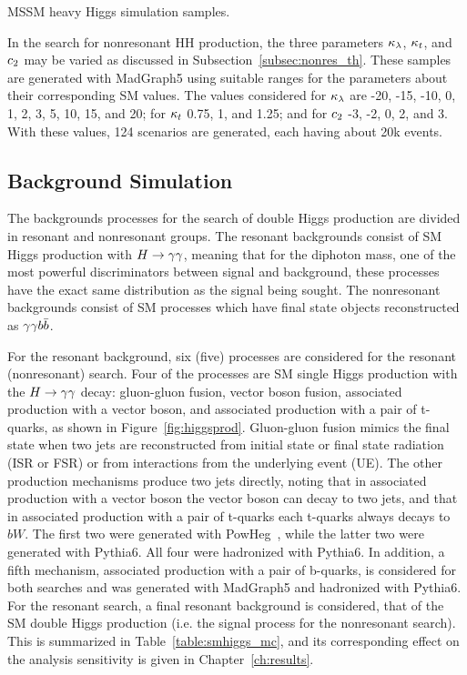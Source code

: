 \begin{table}[ht]
  \centering
  \renewcommand{\arraystretch}{1.4}
  \caption{MSSM heavy Higgs simulation samples.}
  
  \label{table:mssm_mc}
\end{table}

In the search for nonresonant HH production, the three parameters $\kappa_{\lambda}$, $\kappa_{t}$, and $c_2$
may be varied as discussed in Subsection~\ref{subsec:nonres_th}. These samples are generated
with MadGraph5 using suitable ranges for the parameters about their corresponding SM values. The
values considered for $\kappa_{\lambda}$ are -20, -15, -10, 0, 1, 2, 3, 5, 10, 15, and 20; for $\kappa_{t}$ 0.75, 1, and 1.25; and for $c_2$ -3, -2, 0, 2, and 3.
With these values, 124 scenarios are generated, each having about 20k events.

\subsection{Background Simulation\label{subsec:bkg_samples}}

The backgrounds processes for the search of double Higgs production are divided in resonant and
nonresonant groups. The resonant backgrounds consist of SM Higgs production with $H\to\gamma\gamma$, meaning
that for the diphoton mass, one of the most powerful discriminators between signal and background,
these processes have the exact same distribution as the signal being sought. The nonresonant backgrounds
consist of SM processes which have final state objects reconstructed as $\gamma\gamma b\bar{b}$.

For the resonant background, six (five) processes are considered for the resonant (nonresonant) search.
Four of the processes are SM single Higgs production with the $H\to\gamma\gamma$ decay: gluon-gluon fusion, vector
boson fusion, associated production with a vector boson, and associated production with a pair of
t-quarks, as shown in Figure~\ref{fig:higgsprod}. Gluon-gluon fusion mimics the final state when two
jets are reconstructed from initial state or final state radiation (ISR or FSR)
or from interactions from the underlying event (UE).
The other production mechanisms produce two jets directly,
noting that in associated production with a vector boson the vector boson can decay to two jets, and
that in associated production with a pair of t-quarks each t-quarks always decays to $bW$.
The first two were generated with PowHeg~\cite{POWHEG_Frixione:2007vw},
while the latter two were generated with Pythia6.
All four were hadronized with Pythia6.
In addition, a fifth mechanism, associated production with a pair of b-quarks, is considered for
both searches and was generated with MadGraph5 and hadronized with Pythia6.
For the resonant search, a final resonant background is considered, that of the
SM double Higgs production (i.e. the signal process for the nonresonant search).
This is summarized in Table~\ref{table:smhiggs_mc}, and its corresponding effect on the analysis
sensitivity is given in Chapter~\ref{ch:results}.

